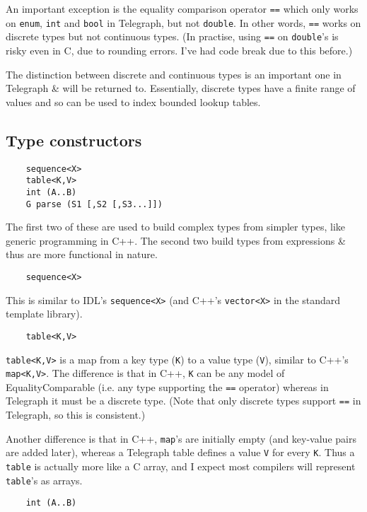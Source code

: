 \documentclass{article}
\begin{document}
An important exception is the equality comparison operator {\tt ==} which only
works on {\tt enum}, {\tt int} and {\tt bool} in Telegraph, but not {\tt double}. In other
words, {\tt ==} works on discrete types but not continuous types. (In
practise, using {\tt ==} on {\tt double}'s is risky even in C, due to rounding
errors. I've had code break due to this before.)

The distinction between discrete and continuous types is an important one
in Telegraph \& will be returned to. Essentially, discrete types have a
finite range of values and so can be used to index bounded lookup tables.

\subsection{Type constructors}

\begin{verbatim}
	sequence<X>
	table<K,V>
	int (A..B)
	G parse (S1 [,S2 [,S3...]])
\end{verbatim}

The first two of these are used to build complex types from simpler types,
like generic programming in C++. The second two build types from
expressions \& thus are more functional in nature.

\begin{verbatim}
	sequence<X>
\end{verbatim}

This is similar to IDL's {\tt sequence<X>} (and C++'s {\tt vector<X>} in the
standard template library).

\begin{verbatim}
	table<K,V>
\end{verbatim}

{\tt table<K,V>} is a map from a key type ({\tt K}) to a value type ({\tt V}), similar to
C++'s {\tt map<K,V>}. The difference is that in C++, {\tt K} can be any model of
EqualityComparable (i.e. any type supporting the {\tt ==} operator) whereas
in Telegraph it must be a discrete type. (Note that only discrete types
support {\tt ==} in Telegraph, so this is consistent.)

Another difference is that in C++, {\tt map}'s are initially empty (and
key-value pairs are added later), whereas a Telegraph table defines a
value {\tt V} for every {\tt K}. Thus a {\tt table} is actually more like a C array, and
I expect most compilers will represent {\tt table}'s as arrays.

\begin{verbatim}
	int (A..B)
\end{verbatim}
\end{document}
